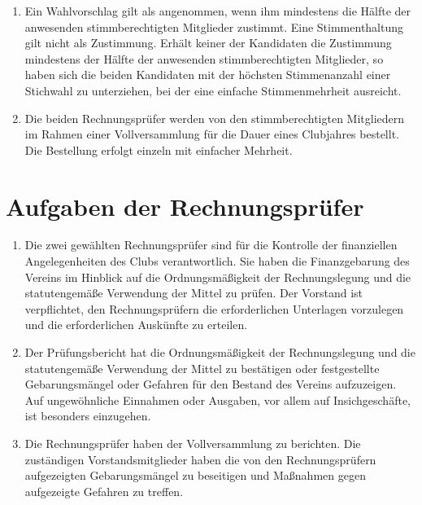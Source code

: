 \documentclass{statutclass}
\begin{document}
\begin{enumerate}[ref=Absatz \arabic*]
    \item Ein Wahlvorschlag gilt als angenommen, wenn ihm mindestens die Hälfte der anwesenden stimmberechtigten Mitglieder zustimmt. Eine Stimmenthaltung gilt nicht als Zustimmung. Erhält keiner der Kandidaten die Zustimmung mindestens der Hälfte der anwesenden stimmberechtigten Mitglieder, so haben sich die beiden Kandidaten mit der höchsten Stimmenanzahl einer Stichwahl zu unterziehen, bei der eine einfache Stimmenmehrheit ausreicht.
    \item Die beiden Rechnungsprüfer werden von den stimmberechtigten Mitgliedern im Rahmen einer Vollversammlung für die Dauer eines Clubjahres bestellt. Die Bestellung erfolgt einzeln mit einfacher Mehrheit.
\end{enumerate}

\section{Aufgaben der Rechnungsprüfer}
\begin{enumerate}
    \item Die zwei gewählten Rechnungsprüfer sind für die Kontrolle der finanziellen Angelegenheiten des Clubs verantwortlich. Sie haben die Finanzgebarung des Vereins im Hinblick auf die Ordnungsmäßigkeit der Rechnungslegung und die statutengemäße Verwendung der Mittel zu prüfen. Der Vorstand ist verpflichtet, den Rechnungsprüfern die erforderlichen Unterlagen vorzulegen und die erforderlichen Auskünfte zu erteilen.
    \item Der Prüfungsbericht hat die Ordnungsmäßigkeit der Rechnungslegung und die statutengemäße Verwendung der Mittel zu bestätigen oder festgestellte Gebarungsmängel oder Gefahren für den Bestand des Vereins aufzuzeigen. Auf ungewöhnliche Einnahmen oder Ausgaben, vor allem auf Insichgeschäfte, ist besonders einzugehen.
    \item Die Rechnungsprüfer haben der Vollversammlung zu berichten. Die zuständigen Vorstandsmitglieder haben die von den Rechnungsprüfern aufgezeigten Gebarungsmängel zu beseitigen und Maßnahmen gegen aufgezeigte Gefahren zu treffen.
\end{enumerate}
\end{document}
